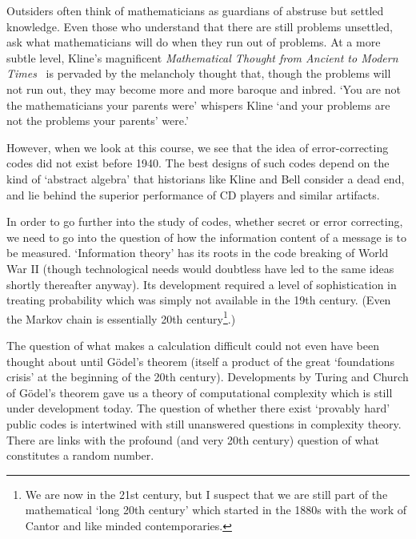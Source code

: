 \documentclass[12pt,a4paper]{article}
\theoremstyle{plain}
\theoremstyle{definition}
\begin{document}
    Outsiders often think of mathematicians as
    guardians of abstruse but settled knowledge.
    Even those who understand that there are
    still problems unsettled, ask what
    mathematicians will do when they run out
    of problems. At a more subtle
    level, Kline's magnificent
    \emph{Mathematical Thought from Ancient to
    Modern Times}~\cite{Kline} is pervaded by
    the melancholy thought
    that, though the problems
    will not run out, they may become more
    and more baroque and inbred. `You are not the mathematicians
    your
    parents were' whispers Kline
    `and your problems are not the
    problems your parents' were.'

    However, when we look at this course, we
    see that the idea of error-correcting codes
    did not exist before 1940. The best
    designs of such codes depend on the kind
    of `abstract algebra' that historians
    like Kline and Bell consider a dead end,
    and lie behind the superior
    performance of CD players and
    similar artifacts.

    In order to go further into the study of codes, whether
    secret or error correcting, we need to go
    into the question of how the information
    content of a message is to be measured.
    `Information theory' has its roots in the
    code breaking of World War II (though
    technological needs would doubtless
    have led to the same ideas shortly
    thereafter anyway). Its development
    required a level of sophistication
    in treating probability which was simply
    not available in the 19th century.
    (Even the Markov chain is essentially 20th
    century\footnote{We are now in the 21st century,
    but I suspect that we are still part
    of the mathematical `long 20th century'
    which started in the 1880s with the work of Cantor
    and like minded contemporaries.}.)

    The question of what makes a calculation difficult
    could not even have been thought about until
    G\"{o}del's theorem (itself a product of
    the great `foundations crisis' at the beginning
    of the 20th century). Developments by
    Turing and Church of G\"{o}del's theorem
    gave us a theory of computational complexity
    which is still under development today.
    The question of whether there exist
    `provably hard' public codes is intertwined
    with still unanswered questions in complexity
    theory. There are links with the profound
    (and very 20th century) question of what
    constitutes a random number.
\end{document}
